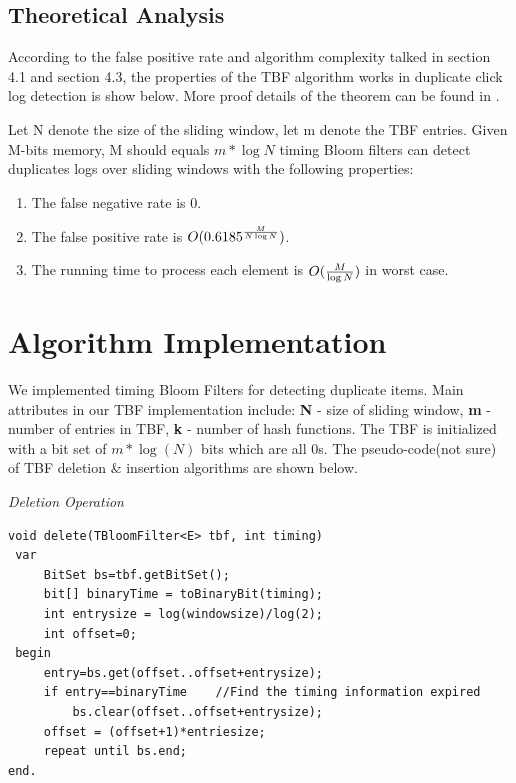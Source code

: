 \documentclass[runningheads,report]{llncs}
\begin{document}
\subsection{Theoretical Analysis}
According to the false positive rate and algorithm complexity talked in section 4.1 and section 4.3, the properties of the TBF algorithm works in duplicate click log detection is show below. More proof details of the theorem can be found in \cite{DBLP:conf/icdcs/ZhangG08}.

\begin{theorem}
Let N denote the size of the sliding window, let m denote the TBF entries. Given M-bits memory, M should equals $m*\log N$ timing Bloom filters can detect duplicates logs over sliding windows with the following properties:
\begin{enumerate}
\item The false negative rate is 0.
\item The false positive rate is $O({0.6185^{{M \over {N\log N}}}})$.
\item The running time to process each element is $O({M \over \log N})$ in worst case.
\end{enumerate}

\end{theorem}

\section{Algorithm Implementation}

We implemented timing Bloom Filters for detecting duplicate items. Main attributes in our TBF implementation include: \textbf{N} - size of sliding window, \textbf{m} - number of entries in TBF, \textbf{k} - number of hash functions. The TBF is initialized with a bit set of $m*\log(N)$ bits which are all 0s. The pseudo-code(not sure) of TBF deletion \& insertion algorithms are shown below.

\medskip

\noindent
{\it Deletion Operation}
\begin{verbatim}
void delete(TBloomFilter<E> tbf, int timing)
 var
     BitSet bs=tbf.getBitSet();  
     bit[] binaryTime = toBinaryBit(timing);
     int entrysize = log(windowsize)/log(2);
     int offset=0; 
 begin
     entry=bs.get(offset..offset+entrysize);
     if entry==binaryTime    //Find the timing information expired
         bs.clear(offset..offset+entrysize);
     offset = (offset+1)*entriesize;
     repeat until bs.end;
end.
\end{verbatim}
%
\noindent
\end{document}
